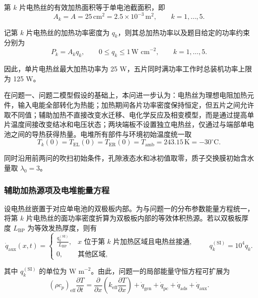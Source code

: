\documentclass[bwprint]{gmcmthesis}
\numberwithin{figure}{section}
\begin{document}
\noindent 第 \(k\) 片电热丝的有效加热面积等于单电池截面积，即
\begin{equation}
A_k = A = 25 \, \text{cm}^2 = 2.5 \times 10^{-3} \, \text{m}^2, \qquad k = 1, \dots, 5. \tag{6-1}
\end{equation}

\noindent 记第 \(k\) 片电热丝的加热功率密度为 \(q_k\)，则其总加热功率以及题目给定的功率约束分别为
\begin{equation}
P_k = A_k q_k, \qquad 0 \leq q_k \leq 1 \, \text{W cm}^{-2}, \qquad k = 1, \dots, 5. \tag{6-2}
\end{equation}

\noindent 因此，单片电热丝最大加热功率为 25 W，五片同时满功率工作时总装机功率上限为 125 W。

\noindent 在问题一、问题二模型假设的基础上，本问进一步认为：电热丝为理想电阻加热元件，输入电能全部转化为热能；加热期间各片功率密度保持恒定，但五片之间允许取不同值；辅助加热不直接改变水迁移、电化学反应及相变模型，而是通过提高单片温度间接改变结冰和电压状态；两块端板不设置独立电热丝，仅通过与端部单电池之间的导热获得热量。电堆所有部件与环境初始温度统一取
\begin{equation}
T_k(0) = T_{\text{EL}}(0) = T_{\text{ER}}(0) = T_{\text{amb}} = 243.15 \, \text{K} = -30^\circ\text{C}. \tag{6-3}
\end{equation}

\noindent 同时沿用前两问的吹扫初始条件，孔隙液态水和冰初值取零，质子交换膜初始含水量取 \(\lambda_0 = 3\)。

\subsubsection{辅助加热源项及电堆能量方程}

\noindent 设电热丝嵌置于对应单电池的双极板内部。为与问题一的分布参数能量方程统一，将第 \(k\) 片电热丝的面功率密度折算为双极板内部的等效体积热源。若以双极板厚度 \(L_{\text{BP}}\) 为等效发热厚度，则有
\begin{equation}
\dot{q}_{\text{aux}}(x,t) = \begin{cases}
\frac{q_k^{(\text{SI})}}{L_{\text{BP}}}, & x \text{ 位于第 } k \text{ 片加热区域且电热丝接通}, \\
0, & \text{其他区域},
\end{cases} \qquad q_k^{(\text{SI})} = 10^4 q_k. \tag{6-4}
\end{equation}

\noindent 其中 \(q_k^{(\text{SI})}\) 的单位为 \(\text{W m}^{-2}\)。由此，问题一的局部能量守恒方程可扩展为
\begin{equation}
(\rho c_p)_{\text{eff}} \frac{\partial T}{\partial t} = \frac{\partial}{\partial x} \left( k_{\text{eff}} \frac{\partial T}{\partial x} \right) + \dot{q}_{\text{gen}} + \dot{q}_{\text{pc}} + \dot{q}_{\text{ads}} + \dot{q}_{\text{aux}}. \tag{6-5}
\end{equation}
\end{document}
